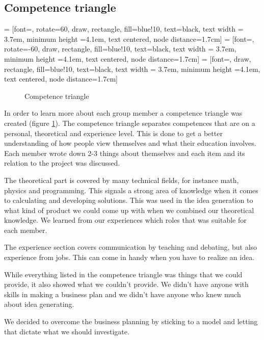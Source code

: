 \subsection{Competence triangle}

 = [font=\footnotesize, rotate=60,  draw, rectangle, fill=blue!10, text=black, text width = 3.7em, minimum height =4.1em, text centered, node distance=1.7cm]
 =  [font=\footnotesize, rotate=-60, draw, rectangle, fill=blue!10, text=black, text width = 3.7em, minimum height =4.1em, text centered, node distance=1.7cm]
 = [font=\footnotesize,             draw, rectangle, fill=blue!10, text=black, text width = 3.7em, minimum height =4.1em, text centered, node distance=1.7cm]

\begin{figure}[!ht]
\centering
{}
\caption{Competence triangle \label{fig_triangle}}
\end{figure}

In order to learn more about each group member a competence triangle was created (figure \ref{fig_triangle}). 
The competence triangle separates competences that are on a personal, theoretical and experience level. 
This is done to get a better understanding of how people view themselves and what their education involves.
Each member wrote down 2-3 things about themselves and each item and its relation to the project was discussed.

The theoretical part is covered by many technical fields, for instance math, physics and programming. 
This signals a strong area of knowledge when it comes to calculating and developing solutions. 
This was used in the idea generation to what kind of product we could come up with when we combined our theoretical knowledge.
We learned from our experiences which roles that was suitable for each member. 

The experience section covers communication by teaching and debating, but also experience from jobs. 
This can come in handy when you have to realize an idea. 

While everything listed in the competence triangle was things that we could provide, it also showed what we couldn't provide.
We didn't have anyone with skills in making a business plan and we didn't have anyone who knew much about idea generating.

We decided to overcome the business planning by sticking to a model and letting that dictate what we should investigate.